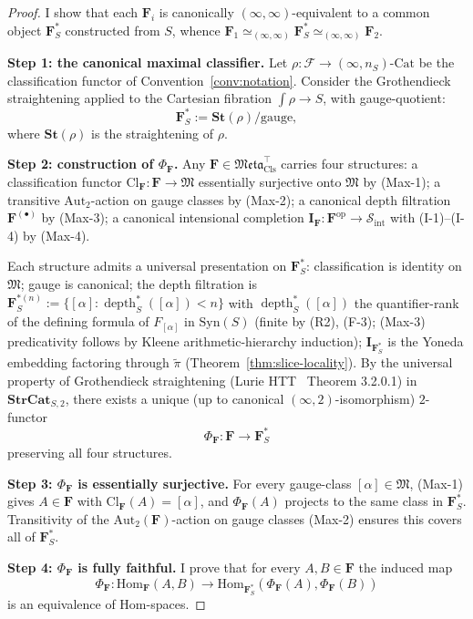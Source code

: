 \documentclass[11pt]{article}
\theoremstyle{plain}
\theoremstyle{definition}
\newcommand{\cS}{\mathcal{S}}
\newcommand{\cF}{\mathcal{F}}
\newcommand{\fM}{\mathfrak{M}}
\newcommand{\Meta}{\mathfrak{Meta}}
\newcommand{\Sint}{\cS_{\mathrm{int}}}
\newcommand{\Hom}{\mathrm{Hom}}
\newcommand{\Cl}{\mathrm{Cl}}
\newcommand{\Cat}{\mathrm{Cat}}
\newcommand{\Syn}{\mathrm{Syn}}
\newcommand{\II}{\mathbf{I}}
\DeclareMathOperator{\dep}{depth}
\begin{document}
\begin{proof}
I show that each $\mathbf{F}_i$ is canonically $(\infty, \infty)$-equivalent to a common object $\mathbf{F}_S^*$ constructed from $S$, whence $\mathbf{F}_1 \simeq_{(\infty, \infty)} \mathbf{F}_S^* \simeq_{(\infty, \infty)} \mathbf{F}_2$.

\textbf{Step 1: the canonical maximal classifier.} Let $\rho : \cF \to (\infty, n_S)\text{-}\Cat$ be the classification functor of Convention~\ref{conv:notation}. Consider the Grothendieck straightening applied to the Cartesian fibration $\int \rho \to S$, with gauge-quotient:
\[ \mathbf{F}_S^* := \mathbf{St}(\rho) / \mathrm{gauge}, \]
where $\mathbf{St}(\rho)$ is the straightening of $\rho$.

\textbf{Step 2: construction of $\Phi_\mathbf{F}$.} Any $\mathbf{F} \in \Meta_{\mathrm{Cls}}^{\top}$ carries four structures: a classification functor $\Cl_{\mathbf{F}} : \mathbf{F} \to \fM$ essentially surjective onto $\fM$ by (Max-1); a transitive $\mathrm{Aut}_2$-action on gauge classes by (Max-2); a canonical depth filtration $\mathbf{F}^{(\bullet)}$ by (Max-3); a canonical intensional completion $\II_{\mathbf{F}} : \mathbf{F}^{\mathrm{op}} \to \Sint$ with (I-1)--(I-4) by (Max-4).

Each structure admits a universal presentation on $\mathbf{F}_S^*$: classification is identity on $\fM$; gauge is canonical; the depth filtration is $\mathbf{F}_S^{*(n)} := \{[\alpha] : \dep_S^*([\alpha]) < n\}$ with $\dep_S^*([\alpha])$ the quantifier-rank of the defining formula of $F_{[\alpha]}$ in $\Syn(S)$ (finite by (R2), (F-3); (Max-3) predicativity follows by Kleene arithmetic-hierarchy induction); $\II_{\mathbf{F}_S^*}$ is the Yoneda embedding factoring through $\tilde\pi$ (Theorem~\ref{thm:slice-locality}). By the universal property of Grothendieck straightening (Lurie HTT~\cite{LurieHTT} Theorem 3.2.0.1) in $\mathbf{StrCat}_{S, 2}$, there exists a unique (up to canonical $(\infty, 2)$-isomorphism) $2$-functor
\[ \Phi_\mathbf{F} : \mathbf{F} \to \mathbf{F}_S^* \]
preserving all four structures.

\textbf{Step 3: $\Phi_\mathbf{F}$ is essentially surjective.} For every gauge-class $[\alpha] \in \fM$, (Max-1) gives $A \in \mathbf{F}$ with $\Cl_\mathbf{F}(A) = [\alpha]$, and $\Phi_\mathbf{F}(A)$ projects to the same class in $\mathbf{F}_S^*$. Transitivity of the $\mathrm{Aut}_2(\mathbf{F})$-action on gauge classes (Max-2) ensures this covers all of $\mathbf{F}_S^*$.

\textbf{Step 4: $\Phi_\mathbf{F}$ is fully faithful.} I prove that for every $A, B \in \mathbf{F}$ the induced map
\[ \Phi_\mathbf{F} : \Hom_\mathbf{F}(A, B) \longrightarrow \Hom_{\mathbf{F}_S^*}(\Phi_\mathbf{F}(A), \Phi_\mathbf{F}(B)) \]
is an equivalence of Hom-spaces.


\end{proof}
\end{document}
